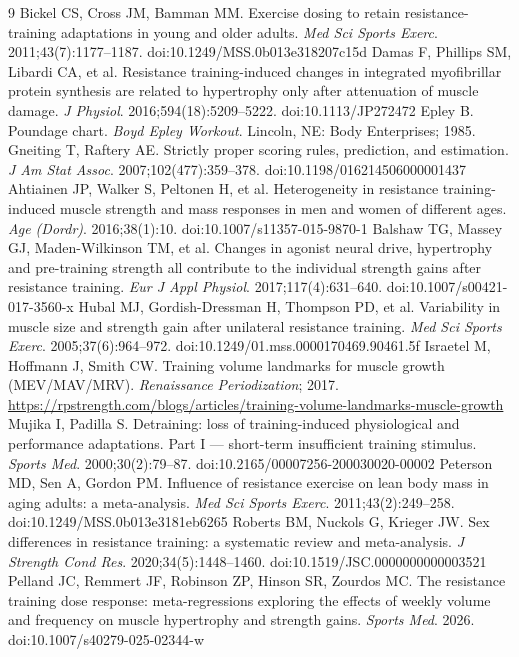\documentclass[11pt,a4paper]{article}
\begin{document}
\begin{thebibliography}{9}
\small
{} Bickel CS, Cross JM, Bamman MM. Exercise dosing to retain resistance-training adaptations in young and older adults. \emph{Med Sci Sports Exerc}. 2011;43(7):1177--1187. doi:10.1249/MSS.0b013e318207c15d
 Damas F, Phillips SM, Libardi CA, et al. Resistance training-induced changes in integrated myofibrillar protein synthesis are related to hypertrophy only after attenuation of muscle damage. \emph{J Physiol}. 2016;594(18):5209--5222. doi:10.1113/JP272472
 Epley B. Poundage chart. \emph{Boyd Epley Workout}. Lincoln, NE: Body Enterprises; 1985.
 Gneiting T, Raftery AE. Strictly proper scoring rules, prediction, and estimation. \emph{J Am Stat Assoc}. 2007;102(477):359--378. doi:10.1198/016214506000001437
 Ahtiainen JP, Walker S, Peltonen H, et al. Heterogeneity in resistance training-induced muscle strength and mass responses in men and women of different ages. \emph{Age (Dordr)}. 2016;38(1):10. doi:10.1007/s11357-015-9870-1
 Balshaw TG, Massey GJ, Maden-Wilkinson TM, et al. Changes in agonist neural drive, hypertrophy and pre-training strength all contribute to the individual strength gains after resistance training. \emph{Eur J Appl Physiol}. 2017;117(4):631--640. doi:10.1007/s00421-017-3560-x
 Hubal MJ, Gordish-Dressman H, Thompson PD, et al. Variability in muscle size and strength gain after unilateral resistance training. \emph{Med Sci Sports Exerc}. 2005;37(6):964--972. doi:10.1249/01.mss.0000170469.90461.5f
 Israetel M, Hoffmann J, Smith CW. Training volume landmarks for muscle growth (MEV/MAV/MRV). \emph{Renaissance Periodization}; 2017. \url{https://rpstrength.com/blogs/articles/training-volume-landmarks-muscle-growth}
 Mujika I, Padilla S. Detraining: loss of training-induced physiological and performance adaptations. Part I --- short-term insufficient training stimulus. \emph{Sports Med}. 2000;30(2):79--87. doi:10.2165/00007256-200030020-00002
 Peterson MD, Sen A, Gordon PM. Influence of resistance exercise on lean body mass in aging adults: a meta-analysis. \emph{Med Sci Sports Exerc}. 2011;43(2):249--258. doi:10.1249/MSS.0b013e3181eb6265
 Roberts BM, Nuckols G, Krieger JW. Sex differences in resistance training: a systematic review and meta-analysis. \emph{J Strength Cond Res}. 2020;34(5):1448--1460. doi:10.1519/JSC.0000000000003521
 Pelland JC, Remmert JF, Robinson ZP, Hinson SR, Zourdos MC. The resistance training dose response: meta-regressions exploring the effects of weekly volume and frequency on muscle hypertrophy and strength gains. \emph{Sports Med}. 2026. doi:10.1007/s40279-025-02344-w

\end{thebibliography}
\end{document}
